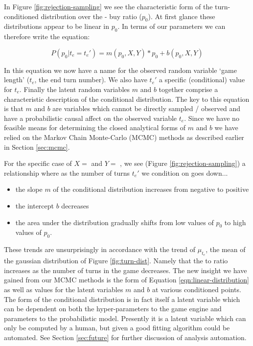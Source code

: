 In Figure \ref{fig:rejection-sampling} we see the characteristic
form of the turn-conditioned distribution over the
 -  buy ratio ($p_0$). At first glance
these distributions appear to be linear in $p_0$. In terms of our
parameters we can therefore write the equation:

\begin{equation} \label{eqn:linear-distribution}
P(p_0 | t_e = t_e') = m(p_0, X, Y) * p_0 + b(p_0, X, Y)
\end{equation}

In this equation we now have a name for the observed random variable
`game length' ($t_e$, the end turn number).
We also have $t_e'$ a specific (conditional) value for $t_e$.
Finally the latent random variables $m$ and $b$ together comprise a
characteristic description of the conditional distribution. The
key to this equation is that $m$ and $b$ are variables which cannot
be directly sampled / observed and have a probabilistic causal affect
on the observed variable $t_e$.
Since we have no feasible means for determining the closed analytical
forms of $m$ and $b$ we have relied on the Markov Chain Monte-Carlo (MCMC)
methods as described earlier in Section \ref{sec:mcmc}.

For the specific case of $X =$  and $Y =$ ,
we see (Figure \ref{fig:rejection-sampling}) a relationship where as the
number of turns $t_e'$ we condition on goes down...

\begin{itemize}
\item the slope $m$ of the conditional distribution increases from negative to positive
\item the intercept $b$ decreases
\item the area under the distribution gradually shifts from low values of $p_0$ to
      high values of $p_0$.
\end{itemize}

These trends are unsurprisingly in accordance with the trend of $\mu_{t_e}$,
the mean of the gaussian distribution of Figure \ref{fig:turn-dist}. Namely
that the  to  ratio increases as the number of
turns in the game decreases. The new insight we have gained from our MCMC
methods is the form of Equation \ref{eqn:linear-distribution} as well as values
for the latent variables $m$ and $b$ at various conditioned points. The form
of the conditional distribution is in fact itself a latent variable which
can be dependent on both the hyper-parameters to the game engine and parameters
to the probabilistic model. Presently it is a latent variable which can only be
computed by a human, but given a good fitting algorithm could be automated.
See Section \ref{sec:future} for further discussion of analysis automation.


